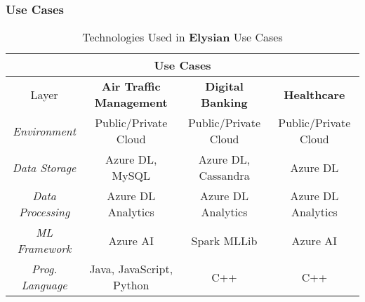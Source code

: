 \documentclass[a4paper,11pt]{article}
\newcommand{\project}[1]{\textbf{#1}\xspace}
\newcommand{\SECURITY}{\project{Elysian}}
\newcommand{\TheProject}{\SECURITY}
\begin{document}
\subsubsection{Use Cases}
\label{sect:applications}
\label{sect:background-last}

\begin{table}[!htb]
\begin{center}
\begin{tabular}{|c||c|c|c|}
\hline \hline
\multicolumn{4}{|c|}{Use Cases} \\ \hline
Layer & \textbf{Air Traffic Management} & \textbf{Digital Banking} & \textbf{Healthcare} \\
\hline \hline
\emph{Environment} & Public/Private Cloud & Public/Private Cloud & Public/Private Cloud  \\
\emph{Data Storage} & Azure DL, MySQL & Azure DL, Cassandra & Azure DL  \\
\emph{Data Processing} & Azure DL Analytics & Azure DL Analytics & Azure DL Analytics  \\
\emph{ML Framework} & Azure AI & Spark MLLib & Azure AI  \\
\emph{Prog. Language} & Java, JavaScript, Python & C++ & C++ \\
\hline \hline
\end{tabular}
\caption{Technologies Used in \TheProject{} Use Cases}
\label{tab:usecases}
\end{center}
\end{table}
\end{document}
